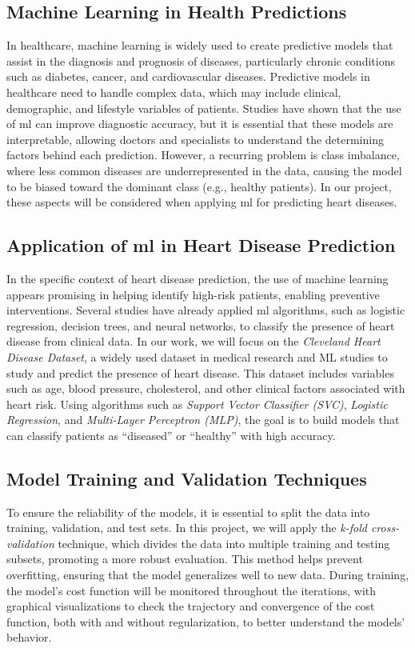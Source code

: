 \subsection{Machine Learning in Health Predictions}
In healthcare, machine learning is widely used to create predictive models that assist in the diagnosis and prognosis of diseases, particularly chronic conditions such as diabetes, cancer, and cardiovascular diseases. Predictive models in healthcare need to handle complex data, which may include clinical, demographic, and lifestyle variables of patients. Studies have shown that the use of \acrshort{ml} can improve diagnostic accuracy, but it is essential that these models are interpretable, allowing doctors and specialists to understand the determining factors behind each prediction. However, a recurring problem is class imbalance, where less common diseases are underrepresented in the data, causing the model to be biased toward the dominant class (e.g., healthy patients). In our project, these aspects will be considered when applying \acrshort{ml} for predicting heart diseases.

\subsection{Application of \acrshort{ml} in Heart Disease Prediction}
In the specific context of heart disease prediction, the use of machine learning appears promising in helping identify high-risk patients, enabling preventive interventions. Several studies have already applied \acrshort{ml} algorithms, such as logistic regression, decision trees, and neural networks, to classify the presence of heart disease from clinical data. In our work, we will focus on the \textit{Cleveland Heart Disease Dataset}, a widely used dataset in medical research and ML studies to study and predict the presence of heart disease. This dataset includes variables such as age, blood pressure, cholesterol, and other clinical factors associated with heart risk. Using algorithms such as \textit{Support Vector Classifier (SVC)}, \textit{Logistic Regression}, and \textit{Multi-Layer Perceptron (MLP)}, the goal is to build models that can classify patients as “diseased” or “healthy” with high accuracy.

\subsection{Model Training and Validation Techniques}
To ensure the reliability of the models, it is essential to split the data into training, validation, and test sets. In this project, we will apply the \textit{k-fold cross-validation} technique, which divides the data into multiple training and testing subsets, promoting a more robust evaluation. This method helps prevent overfitting, ensuring that the model generalizes well to new data. During training, the model’s cost function will be monitored throughout the iterations, with graphical visualizations to check the trajectory and convergence of the cost function, both with and without regularization, to better understand the models' behavior.

